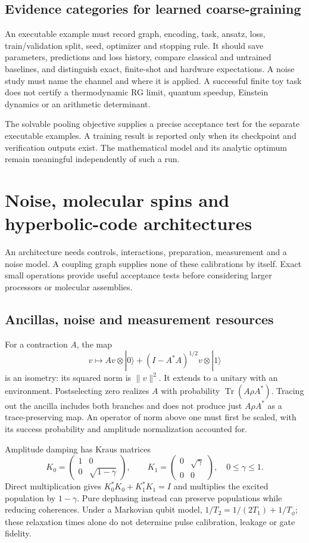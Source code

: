 \documentclass[11pt,oneside,openany]{book}
\theoremstyle{definition}\newtheorem{definition}[theorem]{Definition}
\theoremstyle{remark}\newtheorem{remark}[theorem]{Remark}
\begin{document}
\section{Evidence categories for learned coarse-graining}
An executable example must record graph, encoding, task, ansatz, loss,
train/validation split, seed, optimizer and stopping rule. It should save
parameters, predictions and loss history, compare classical and untrained
baselines, and distinguish exact, finite-shot and hardware expectations.
A noise study must name the channel and where it is applied. A successful
finite toy task does not certify a thermodynamic RG limit, quantum speedup,
Einstein dynamics or an arithmetic determinant.

The solvable pooling objective supplies a precise acceptance test for the
separate executable examples. A training result is reported only when
its checkpoint and verification outputs exist. The mathematical model and
its analytic optimum remain meaningful independently of such a run.

\chapter{Noise, molecular spins and hyperbolic-code architectures}
\label{phys:hardware}

An architecture needs controls, interactions, preparation, measurement and
a noise model. A coupling graph supplies none of these calibrations by
itself. Exact small operations provide useful acceptance tests before
considering larger processors or molecular assemblies.

\section{Ancillas, noise and measurement resources}
For a contraction $A$, the map
\[
 v\longmapsto Av\otimes|0\rangle+
       (I-A^*A)^{1/2}v\otimes|1\rangle
\]
is an isometry: its squared norm is $\|v\|^2$. It extends to a unitary
with an environment. Postselecting zero realizes $A$ with probability
$\operatorname{Tr}(A\rho A^*)$. Tracing out the ancilla includes both
branches and does not produce just $A\rho A^*$ as a trace-preserving map.
An operator of norm above one must first be scaled, with its success
probability and amplitude normalization accounted for.

Amplitude damping has Kraus matrices
\[
 K_0=\begin{pmatrix}1&0\\0&\sqrt{1-\gamma}\end{pmatrix},\qquad
 K_1=\begin{pmatrix}0&\sqrt\gamma\\0&0\end{pmatrix},\quad0\le\gamma\le1.
\]
Direct multiplication gives $K_0^*K_0+K_1^*K_1=I$ and multiplies the
excited population by $1-\gamma$. Pure dephasing instead can preserve
populations while reducing coherences. Under a Markovian qubit model,
$1/T_2=1/(2T_1)+1/T_\phi$; these relaxation times alone do not determine
pulse calibration, leakage or gate fidelity.
\end{document}
